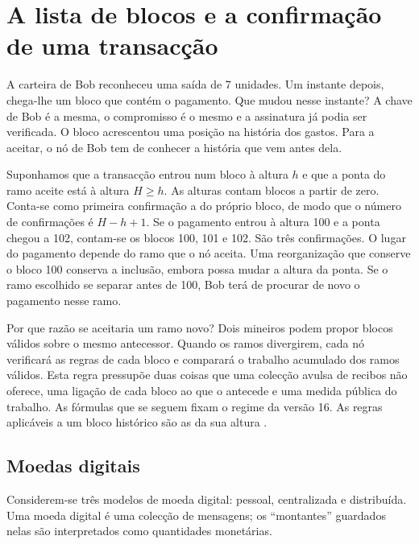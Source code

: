 \chapter{A lista de blocos e a confirmação de uma transacção}
\label{chapter:blockchain}

A carteira de Bob reconheceu uma saída de 7 unidades. Um instante
depois, chega-lhe um bloco que contém o pagamento. Que mudou nesse
instante? A chave de Bob é a mesma, o compromisso é o mesmo e a
assinatura já podia ser verificada. O bloco acrescentou uma posição
na história dos gastos. Para a aceitar, o nó de Bob tem de conhecer a
história que vem antes dela.

Suponhamos que a transacção entrou num bloco à altura \(h\) e que
a ponta do ramo aceite está à altura \(H\ge h\). As alturas contam
blocos a partir de zero. Conta-se como primeira confirmação a do
próprio bloco, de modo que o número de confirmações é \(H-h+1\).
Se o pagamento entrou à altura 100 e a ponta chegou a 102, contam-se
os blocos 100, 101 e 102. São três confirmações. O lugar do pagamento
depende do ramo que o nó aceita. Uma reorganização que conserve o
bloco 100 conserva a inclusão, embora possa mudar a altura da ponta.
Se o ramo escolhido se separar antes de 100, Bob terá de procurar de
novo o pagamento nesse ramo.

Por que razão se aceitaria um ramo novo? Dois mineiros podem propor
blocos válidos sobre o mesmo antecessor. Quando os ramos divergirem,
cada nó verificará as regras de cada bloco e comparará o trabalho
acumulado dos ramos válidos. Esta regra pressupõe duas coisas que uma
colecção avulsa de recibos não oferece, uma ligação de cada bloco ao
que o antecede e uma medida pública do trabalho. As fórmulas que se
seguem fixam o regime da versão 16. As regras aplicáveis a um bloco
histórico são as da sua altura \cite{Nakamoto_bitcoin,monero-source-v16}.

\section{Moedas digitais}
\label{sec:digital-currency}

Considerem-se três modelos de moeda digital: pessoal, centralizada e
distribuída. Uma moeda digital é uma colecção de
mensagens; os ``montantes'' guardados nelas são interpretados como quantidades
monetárias.

